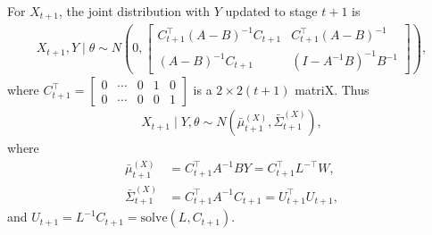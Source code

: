 For $X_{t+1}$, the joint distribution with $Y$ updated to stage $t+1$ is 
\begin{align*}
X_{t+1}, Y\mid \theta \sim N\left( 0, \begin{bmatrix}
C_{t+1}^\top\left(A-B\right) ^{-1}C_{t+1} & C_{t+1}^\top \left(A-B\right)^{-1}\\
\left(A-B\right)^{-1}C_{t+1} & \left(I- A^{-1}B\right) ^{-1}B^{-1}
\end{bmatrix} \right),
\end{align*}
where $C_{t+1}^\top = \begin{bmatrix}
0 & \cdots & 0 & 1 & 0 \\
0 & \cdots & 0 & 0 & 1
\end{bmatrix}$ is a $2 \times 2\left(t+1\right)$ matriX. Thus
\begin{align*}
X_{t+1}\mid Y,\theta \sim N\left( \bar{\mu}_{t+1}^{\left(X\right)},\bar{\Sigma}_{t+1}^{\left(X\right)} \right),
\end{align*}
where
\begin{align*}
\bar{\mu}_{t+1}^{\left(X\right)} & = C_{t+1}^\top A^{-1}BY =C_{t+1}^\top L^{-\top}W,\\
\bar{\Sigma}_{t+1}^{\left(X\right)} & =C_{t+1}^\top A^{-1}C_{t+1} =U_{t+1}^\top U_{t+1},
\end{align*}
and $U_{t+1} = L^{-1} C_{t+1} = \mbox{solve}\left(L,C_{t+1}\right)$.

